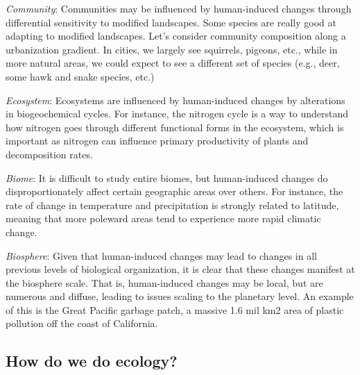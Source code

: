 \documentclass[12pt]{article}
\begin{document}
\bigskip

\textit{Community}:
Communities may be influenced by human-induced changes through differential sensitivity to modified landscapes. Some species are really good at adapting to modified landscapes. Let's consider community composition along a urbanization gradient. In cities, we largely see squirrels, pigeons, etc., while in more natural areas, we could expect to see a different set of species (e.g., deer, some hawk and snake species, etc.)

\bigskip

\textit{Ecosystem}:
Ecosystems are influenced by human-induced changes by alterations in biogeochemical cycles. For instance, the nitrogen cycle is a way to understand how nitrogen goes through different functional forms in the ecosystem, which is important as nitrogen can influence primary productivity of plants and decomposition rates. 

\bigskip


\textit{Biome}: 
It is difficult to study entire biomes, but human-induced changes do disproportionately affect certain geographic areas over others. For instance, the rate of change in temperature and precipitation is strongly related to latitude, meaning that more poleward areas tend to experience more rapid climatic change. 


\bigskip


\textit{Biosphere}:
Given that human-induced changes may lead to changes in all previous levels of biological organization, it is clear that these changes manifest at the biosphere scale. That is, human-induced changes may be local, but are numerous and diffuse, leading to issues scaling to the planetary level. An example of this is the Great Pacific garbage patch, a massive 1.6 mil km2 area of plastic pollution off the coast of California. 


















\subsection*{How do we do ecology?}
\end{document}
